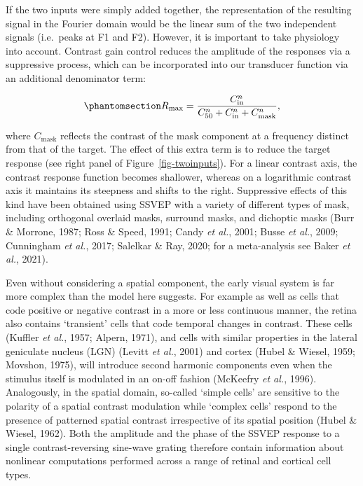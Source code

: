 \documentclass[
  letterpaper,
  DIV=11,
  numbers=noendperiod]{scrartcl}
\begin{document}
If the two inputs were simply added together, the representation of the
resulting signal in the Fourier domain would be the linear sum of the
two independent signals (i.e.~peaks at F1 and F2). However, it is
important to take physiology into account. Contrast gain control reduces
the amplitude of the responses via a suppressive process, which can be
incorporated into our transducer function via an additional denominator
term:

\begin{equation}\phantomsection\label{eq-gaincontrol}{R_{\mathrm{max}} = \frac{C_{\mathrm{in}}^n}{C_{50}^n + C_{\mathrm{in}}^n + C_{\mathrm{mask}}^n},}\end{equation}

where \(C_\mathrm{mask}\) reflects the contrast of the mask component at
a frequency distinct from that of the target. The effect of this extra
term is to reduce the target response (see right panel of
Figure~\ref{fig-twoinputs}). For a linear contrast axis, the contrast
response function becomes shallower, whereas on a logarithmic contrast
axis it maintains its steepness and shifts to the right. Suppressive
effects of this kind have been obtained using SSVEP with a variety of
different types of mask, including orthogonal overlaid masks, surround
masks, and dichoptic masks (Burr \& Morrone, 1987; Ross \& Speed, 1991;
Candy \emph{et al.}, 2001; Busse \emph{et al.}, 2009; Cunningham
\emph{et al.}, 2017; Salelkar \& Ray, 2020; for a meta-analysis see
Baker \emph{et al.}, 2021).

Even without considering a spatial component, the early visual system is
far more complex than the model here suggests. For example as well as
cells that code positive or negative contrast in a more or less
continuous manner, the retina also contains `transient' cells that code
temporal changes in contrast. These cells (Kuffler \emph{et al.}, 1957;
Alpern, 1971), and cells with similar properties in the lateral
geniculate nucleus (LGN) (Levitt \emph{et al.}, 2001) and cortex (Hubel
\& Wiesel, 1959; Movshon, 1975), will introduce second harmonic
components even when the stimulus itself is modulated in an on-off
fashion (McKeefry \emph{et al.}, 1996). Analogously, in the spatial
domain, so-called `simple cells' are sensitive to the polarity of a
spatial contrast modulation while `complex cells' respond to the
presence of patterned spatial contrast irrespective of its spatial
position (Hubel \& Wiesel, 1962). Both the amplitude and the phase of
the SSVEP response to a single contrast-reversing sine-wave grating
therefore contain information about nonlinear computations performed
across a range of retinal and cortical cell types.
\end{document}
